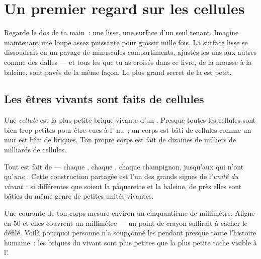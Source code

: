 \chapter{Un premier regard sur les cellules}\label{ch:g5:first-look-at-cells}

Regarde le dos de ta main~: une  lisse, une surface d'un seul
tenant. Imagine maintenant une loupe assez puissante pour grossir
mille fois. La surface lisse se dissoudrait en un pavage de
minuscules compartiments, ajustés les uns aux autres comme des
dalles --- et tous les  que tu as croisés dans ce
livre, de la mousse à la baleine, sont pavés de la même façon. Le
plus grand secret de la  est petit.

\section{Les êtres vivants sont faits de cellules}

\begin{definition}[Cellule]\label{def:g5:first-look-at-cells:cell}
Une \emph{cellule} est la plus petite brique vivante
d'un . Presque toutes les cellules sont bien trop petites
pour être vues à l' nu~; un corps est bâti de cellules comme un
mur est bâti de briques. Ton propre corps est fait de dizaines de
milliers de milliards de cellules.
\end{definition}

\begin{proposition}\label{prop:g5:first-look-at-cells:principle}
Tout  est fait de  --- chaque , chaque
, chaque champignon, jusqu'aux  qui n'ont
qu'\emph{une} . Cette construction partagée est l'un des
grands signes de l'\emph{unité du vivant}~:
si différentes que soient la pâquerette et la baleine, de près elles
sont bâties du même genre de petites unités vivantes.
\end{proposition}
\admitted

\begin{example}\label{ex:g5:first-look-at-cells:small}
Une  courante de ton corps mesure environ un cinquantième de
millimètre. Aligne-en $50$ et elles couvrent un millimètre --- un
point de crayon suffirait à cacher le défilé. Voilà pourquoi
personne n'a soupçonné les  pendant presque toute
l'histoire humaine~: les briques du vivant sont plus petites que la
plus petite tache visible à l'.
\end{example}

